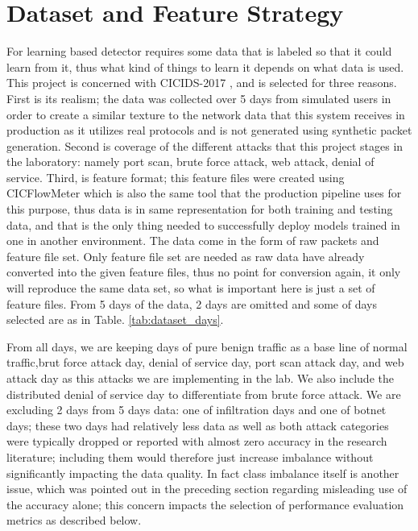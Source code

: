\section{Dataset and Feature Strategy}
\label{sec:conception_dataset}

For learning based detector requires some data that is labeled so that it could learn from it, thus what kind of things to learn it depends on what data is used. This project is concerned with CICIDS-2017 \cite{sharafaldin2018cicids}, and is selected for three reasons. First is its realism; the data was collected over 5 days from simulated users in order to create a similar texture to the network data that this system receives in production as it utilizes real protocols and is not generated using synthetic packet generation. 
Second is coverage of the different attacks that this project stages in the laboratory: namely port scan, brute force attack, web attack, denial of service. 
Third, is feature format; this feature files were created using CICFlowMeter which is also the same tool that the production pipeline uses for this purpose, thus data is in same representation for both training and testing data, and that is the only thing needed to successfully deploy models trained in one in another environment.
The data come in the form of raw packets and feature file set. Only feature file set are needed as raw data have already converted into the given feature files, thus no point for conversion again, it only will reproduce the same data set, so what is important here is just a set of feature files. From 5 days of the data, 2 days are omitted and some of days selected are as in Table. \ref{tab:dataset_days}. 

From all days, we are keeping days of pure benign traffic as a base line of normal traffic,brut force attack day, denial of service day, port scan attack day, and web attack day as this attacks we are implementing in the lab. 
We also include the distributed denial of service day to differentiate from brute force attack. We are excluding 2 days from 5 days data: one of infiltration days and one of botnet days; these two days had relatively less data as well as both attack categories were typically dropped or reported with almost zero accuracy in the research literature; including them would therefore just increase imbalance without significantly impacting the data quality. In fact class imbalance itself is another issue, which was pointed out in the preceding section regarding misleading use of the accuracy alone; this concern impacts the selection of performance evaluation metrics as described below.

